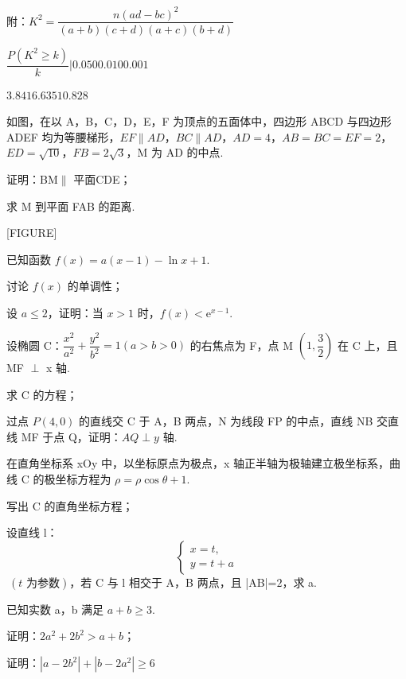 \documentclass[UTF8,12pt]{ctexart}
\begin{document}
\begin{questions}[start=17]
    附：$K^2=\dfrac{n(ad-bc)^2}{(a+b)(c+d)(a+c)(b+d)}$

    $\dfrac{P(K^2\ge k)}{k} | 0.050 0.010 0.001$

    $3.841 6.635 10.828$

  \item 如图，在以 A，B，C，D，E，F 为顶点的五面体中，四边形 ABCD 与四边形 ADEF
    均为等腰梯形，$EF \parallel AD$，$BC \parallel AD$，$AD=4$，$AB = BC = EF=2$，%
    $ED=\sqrt{10}$，$FB=2\sqrt3$，M 为 AD 的中点.

    \begin{subquestions}
      \item
      证明：BM$\parallel$ 平面CDE；
      \item
      求 M 到平面 FAB 的距离.

      [FIGURE]
    \end{subquestions}

  \item 已知函数 $f(x)=a(x-1)-\ln x+1$.

    \begin{subquestions}
      \item
      讨论 $f(x)$ 的单调性；
      \item
      设 $a\le2$，证明：当 $x>1$ 时，$f(x)<\mathrm{e}^{x-1}$.
    \end{subquestions}

  \item 设椭圆 C：$\dfrac{x^2}{a^2}+\dfrac{y^2}{b^2}=1 (a > b>0)$ 的右焦点为 F，点 M
    $\left(1,\dfrac32\right)$ 在 C 上，且 MF $\perp$ x 轴.

    \begin{subquestions}
      \item
      求 C 的方程；
      \item
      过点 $P(4,0)$ 的直线交 C 于 A，B 两点，N 为线段 FP 的中点，直线 NB 交直线 MF 于点
        Q，证明：$AQ\perp y$ 轴.
    \end{subquestions}

  \item 在直角坐标系 xOy 中，以坐标原点为极点，x 轴正半轴为极轴建立极坐标系，曲线 C
    的极坐标方程为 $\rho=\rho\cos\theta+1$.

    \begin{subquestions}
      \item
      写出 C 的直角坐标方程；
      \item
      设直线 l：\[\begin{cases}x=t, \\y=t+a\end{cases}\] $\ (t\text{ 为参数})$，若 C 与
        l 相交于 A，B 两点，且 |AB|=$2$，求 a.
    \end{subquestions}

  \item 已知实数 a，b 满足 $a+b\ge3$.

    \begin{subquestions}
      \item
      证明：$2a^2+2b^2>a+b$；
      \item
      证明：$|a-2b^2|+|b-2a^2|\ge6$
    \end{subquestions}

\end{questions}
\end{document}

